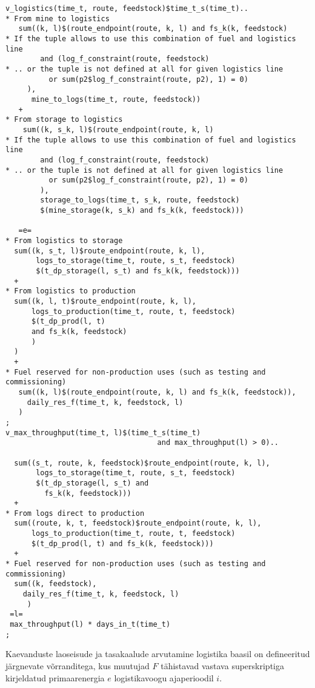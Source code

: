 \documentclass[10pt,a4paper]{article}
\begin{document}
\begin{verbatim}
v_logistics(time_t, route, feedstock)$time_t_s(time_t)..
* From mine to logistics
   sum((k, l)$(route_endpoint(route, k, l) and fs_k(k, feedstock)
* If the tuple allows to use this combination of fuel and logistics line
        and (log_f_constraint(route, feedstock)
* .. or the tuple is not defined at all for given logistics line
          or sum(p2$log_f_constraint(route, p2), 1) = 0)
     ),
      mine_to_logs(time_t, route, feedstock))
   +
* From storage to logistics
    sum((k, s_k, l)$(route_endpoint(route, k, l)
* If the tuple allows to use this combination of fuel and logistics line
        and (log_f_constraint(route, feedstock)
* .. or the tuple is not defined at all for given logistics line
          or sum(p2$log_f_constraint(route, p2), 1) = 0)
        ),
        storage_to_logs(time_t, s_k, route, feedstock)
        $(mine_storage(k, s_k) and fs_k(k, feedstock)))

   =e=
* From logistics to storage
  sum((k, s_t, l)$route_endpoint(route, k, l),
       logs_to_storage(time_t, route, s_t, feedstock)
       $(t_dp_storage(l, s_t) and fs_k(k, feedstock)))
  +
* From logistics to production
  sum((k, l, t)$route_endpoint(route, k, l),
      logs_to_production(time_t, route, t, feedstock)
      $(t_dp_prod(l, t)
      and fs_k(k, feedstock)
      )
  )
  +
* Fuel reserved for non-production uses (such as testing and commissioning)
   sum((k, l)$(route_endpoint(route, k, l) and fs_k(k, feedstock)),
     daily_res_f(time_t, k, feedstock, l)
   )
;
v_max_throughput(time_t, l)$(time_t_s(time_t)
                                   and max_throughput(l) > 0)..

  sum((s_t, route, k, feedstock)$route_endpoint(route, k, l),
       logs_to_storage(time_t, route, s_t, feedstock)
       $(t_dp_storage(l, s_t) and
         fs_k(k, feedstock)))
  +
* From logs direct to production
  sum((route, k, t, feedstock)$route_endpoint(route, k, l),
      logs_to_production(time_t, route, t, feedstock)
      $(t_dp_prod(l, t) and fs_k(k, feedstock)))
  +
* Fuel reserved for non-production uses (such as testing and commissioning)
  sum((k, feedstock),
    daily_res_f(time_t, k, feedstock, l)
     )
 =l=
 max_throughput(l) * days_in_t(time_t)
;
\end{verbatim}

Kaevanduste laoseisude ja tasakaalude arvutamine logistika baasil on defineeritud järgnevate võrranditega, kus muutujad $F$ tähistavad vastava superskriptiga kirjeldatud primaarenergia $e$ logistikavoogu ajaperioodil $i$.
\end{document}
